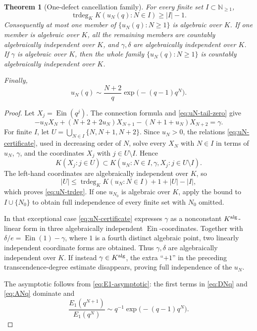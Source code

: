 \documentclass[11pt]{article}
\newtheorem{theorem}{Theorem}[section]
\theoremstyle{definition}
\theoremstyle{remark}
\newcommand{\N}{\mathbb N}
\newcommand{\Ein}{\operatorname{Ein}}
\newcommand{\trdeg}{\operatorname{trdeg}}
\begin{document}
\begin{theorem}[One-defect cancellation family]
\label{thm:uN-defect}
For every finite set \(I\subset\N_{\ge1}\),
\begin{equation}\label{eq:uN-trdeg}
 \boxed{\displaystyle
 \trdeg_K K(u_N(q):N\in I)\ge |I|-1.}
\end{equation}
Consequently at most one member of \(\{u_N(q):N\ge1\}\) is algebraic over
\(K\).  If one member is algebraic over \(K\), all the remaining members are
countably algebraically independent over \(K\), and \(\gamma,\delta\) are
algebraically independent over \(K\).  If \(\gamma\) is algebraic over
\(K\), then the whole family \(\{u_N(q):N\ge1\}\) is countably
algebraically independent over \(K\).

Finally,
\begin{equation}\label{eq:uN-asymptotic}
 u_N(q)\sim\frac{N+2}{q}
 \exp\!\bigl(-(q-1)q^N\bigr).
\end{equation}
\end{theorem}

\begin{proof}
Let \(X_j=\Ein(q^j)\).  The connection formula and
\eqref{eq:uN-tail-zero} give
\begin{equation}\label{eq:uN-certificate}
 -u_NX_N+(N+2+2u_N)X_{N+1}
 -(N+1+u_N)X_{N+2}=\gamma.
\end{equation}
For finite \(I\), let
\(U=\bigcup_{N\in I}\{N,N+1,N+2\}\).  Since \(u_N>0\), the relations
\eqref{eq:uN-certificate}, used in decreasing order of \(N\), solve every
\(X_N\) with \(N\in I\) in terms of \(u_N\), \(\gamma\), and the
coordinates \(X_j\) with \(j\in U\setminus I\).  Hence
\[
 K(X_j:j\in U)
 \subset
 K(u_N:N\in I,\gamma,X_j:j\in U\setminus I).
\]
The left-hand coordinates are algebraically independent over \(K\), so
\[
 |U|\le
 \trdeg_KK(u_N:N\in I)+1+|U|-|I|,
\]
which proves \eqref{eq:uN-trdeg}.  If one \(u_{N_0}\) is algebraic over
\(K\), apply the bound to \(I\cup\{N_0\}\) to obtain full independence of
every finite set with \(N_0\) omitted.

In that exceptional case \eqref{eq:uN-certificate} expresses \(\gamma\) as
a nonconstant \(K^{\rm alg}\)-linear form in three algebraically independent
\(\Ein\)-coordinates.  Together with
\(\delta/e=\Ein(1)-\gamma\), where \(1\) is a fourth distinct algebraic
point, two linearly independent coordinate forms are obtained.  Thus
\(\gamma,\delta\) are algebraically independent over \(K\).  If instead
\(\gamma\in K^{\rm alg}\), the extra ``\(+1\)'' in the preceding
transcendence-degree estimate disappears, proving full independence of the
\(u_N\).

The asymptotic follows from \eqref{eq:E1-asymptotic}: the first terms in
\eqref{eq:DNq} and \eqref{eq:ANq} dominate and
\[
 \frac{E_1(q^{N+1})}{E_1(q^N)}
 \sim q^{-1}\exp\!\bigl(-(q-1)q^N\bigr).
\]
\end{proof}
\end{document}
